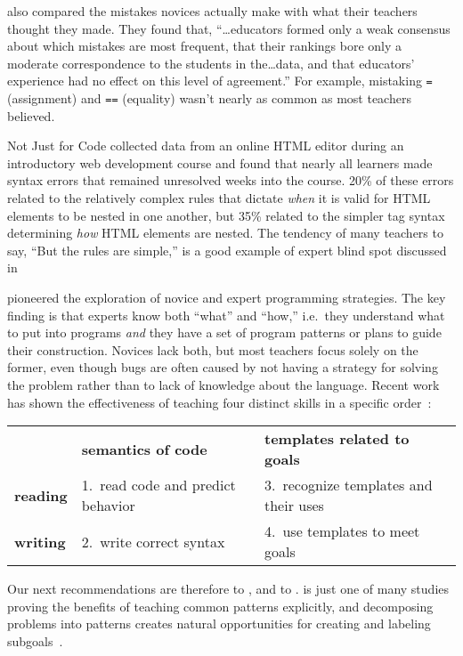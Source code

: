 \cite{Brow2017} also compared the mistakes novices actually make
with what their teachers thought they made.
They found that,
``{\ldots}educators formed only a weak consensus about which mistakes are most frequent,
that their rankings bore only a moderate correspondence to the students in the{\ldots}data,
and that educators' experience had no effect on this level of agreement.''
For example,
mistaking \texttt{=} (assignment) and \texttt{==} (equality)
wasn't nearly as common as most teachers believed.

\begin{aside}{Not Just for Code}
  \cite{Park2015} collected data from an online HTML editor during an introductory web development course
  and found that nearly all learners made syntax errors that remained unresolved weeks into the course.
  20\% of these errors related to the relatively complex rules
  that dictate \emph{when} it is valid for HTML elements to be nested in one another,
  but 35\% related to the simpler tag syntax determining \emph{how} HTML elements are nested.
  The tendency of many teachers to say,
  ``But the rules are simple,''
  is a good example of expert blind spot discussed in 
\end{aside}


\cite{Solo1984,Solo1986} pioneered the exploration of novice and expert programming strategies.
The key finding is that experts know both ``what'' and ``how,''
i.e.\ they understand what to put into programs
\emph{and} they have a set of program patterns or plans to guide their construction.
Novices lack both,
but most teachers focus solely on the former,
even though bugs are often caused by not having a strategy for solving the problem
rather than to lack of knowledge about the language.
Recent work has shown the effectiveness of teaching four distinct skills in a specific order~\cite{Xie2019}:

\begin{longtable}{lll}
		        & \textbf{semantics of code}   		& \textbf{templates related to goals} \\
\textbf{reading}	& 1.\ read code and predict behavior	& 3.\ recognize templates and their uses \\
\textbf{writing}	& 2.\ write correct syntax		& 4.\ use templates to meet goals
\end{longtable}

Our next recommendations are therefore
to ,
and to .
\cite{Mull2007b} is just one of many studies proving the benefits of teaching common patterns explicitly,
and decomposing problems into patterns creates natural opportunities
for creating and labeling subgoals~\cite{Marg2012,Marg2016}.

